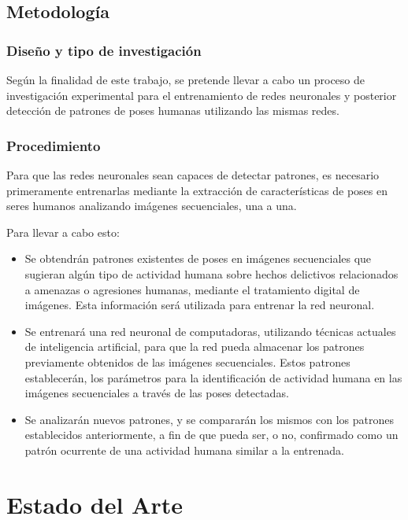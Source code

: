 \documentclass[a4paper,12pt,oneside,spanish]{book}
\begin{document}
\section{Metodología}
\subsection{Diseño y tipo de investigación}
Según la finalidad de este trabajo, se pretende llevar a cabo un proceso de investigación experimental para el entrenamiento de redes neuronales y posterior detección de patrones de poses humanas utilizando las mismas redes.
\par

\subsection{Procedimiento}
Para que las redes neuronales sean capaces de detectar patrones, es necesario primeramente entrenarlas mediante la extracción de características de poses en seres humanos analizando imágenes secuenciales, una a una. \par

Para llevar a cabo esto:
\begin{itemize}
	\setlength\itemsep{0.2em}
	\item Se obtendrán patrones existentes de poses en imágenes secuenciales que sugieran algún tipo de actividad humana sobre hechos delictivos relacionados a amenazas o agresiones humanas, mediante el tratamiento digital de imágenes. Esta información será utilizada para entrenar la red neuronal.\par
	\item Se entrenará una red neuronal de computadoras, utilizando técnicas actuales de inteligencia artificial, para que la red pueda almacenar los patrones previamente obtenidos de las imágenes secuenciales. Estos patrones establecerán, los parámetros para la identificación de actividad humana en las imágenes secuenciales a través de las poses detectadas.\par	
	\item Se analizarán nuevos patrones, y se compararán los mismos con los patrones establecidos anteriormente, a fin de que pueda ser, o no, confirmado como un patrón ocurrente de una actividad humana similar a la entrenada.\par	
\end{itemize}

\newpage
\chapter{Estado del Arte}
\end{document}

